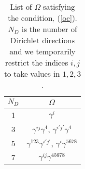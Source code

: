 \documentclass[a4paper,12pt]{article}
\begin{document}
\begin{table}
\begin{center}
\begin{tabular}{c|c}
\hline
 $N_D$ & $\Omega$ \\
\hline
 1 & $\gamma^i$ \\
 3 &  $\gamma^{ij}\gamma^4$, $\gamma^{ i' j'} \gamma^4$ \\
 5 &  $\gamma^{123} \gamma^{i'j'}$, $\gamma^i \gamma^{5678}$ \\
 7 &  $\gamma^{ij} \gamma^{45678}$ \\
\hline
\end{tabular}
\end{center}
\caption{List of $\Omega$ satisfying the condition, (\ref{oc}).
$N_D$ is the number of Dirichlet directions and we temporarily
restrict the indices $i,j$ to take values in $1,2,3$. }
\label{t2}
\end{table}
\end{document}

